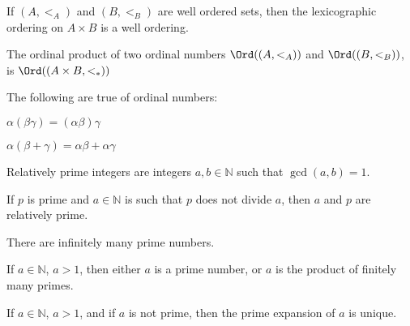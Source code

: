 \documentclass[crop=false,class=book,oneside]{standalone}
\begin{document}
             \begin{theorem*}
                If $(A,<_{A})$ and $(B,<_{B})$ are well ordered
                sets, then the lexicographic ordering
                on ${A}\times{B}$ is a well ordering.
             \end{theorem*}
             \begin{definition}
                The ordinal product of two ordinal numbers
                $\Ord((A,<_{A}))$ and $\Ord((B,<_{B}))$,
                is $\Ord(({A}\times{B},<_{*}))$
             \end{definition}
             \begin{theorem*}
                The following are true of ordinal numbers:
                \begin{enumerate}
                    \begin{multicols}{2}
                        \item $\alpha(\beta\gamma)%
                               =(\alpha\beta)\gamma$
                        \item $\alpha(\beta+\gamma)%
                               =\alpha\beta+\alpha\gamma$
                    \end{multicols}
                \end{enumerate}
             \end{theorem*}
             \begin{definition}
                Relatively prime integers are integers
                $a,b\in\mathbb{N}$ such that $\gcd(a,b)=1$.
             \end{definition}
             \begin{theorem*}
                If $p$ is prime and $a\in\mathbb{N}$ is
                such that $p$ does not divide $a$, then $a$ and $p$
                are relatively prime.
             \end{theorem*}
             \begin{theorem*}
                There are infinitely many prime numbers.
             \end{theorem*}
             \begin{theorem*}
                If $a\in\mathbb{N}$, $a>1$, then either
                $a$ is a prime number, or $a$ is the product
                of finitely many primes.
             \end{theorem*}
             \begin{theorem*}
                If $a\in\mathbb{N}$, $a>1$, and if $a$ is not
                prime, then the prime expansion of $a$ is
                unique.
             \end{theorem*}
\end{document}
